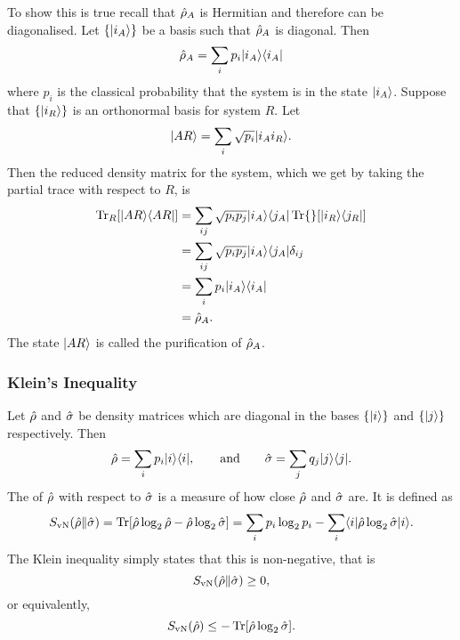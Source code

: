     To show this is true recall that \(\hat{\rho}_A\) is Hermitian and therefore can be diagonalised.
    Let \(\{\vert {i_A} \rangle\}\) be a basis such that \(\hat{\rho}_A\) is diagonal.
    Then
    \[\hat{\rho}_A = \sum_i p_i\vert {i_A}\rangle\langle {i_A} \vert\]
    where \(p_i\) is the classical probability that the system is in the state \(\vert {i_A} \rangle\).
    Suppose that \(\{\vert {i_R} \rangle\}\) is an orthonormal basis for system \(R\).
    Let 
    \[\vert {AR} \rangle = \sum_i \sqrt{p_i}\vert {i_Ai_R} \rangle.\]
    Then the reduced density matrix for the system, which we get by taking the partial trace with respect to \(R\), is
    \begin{align*}
        \Tr_R[\vert {AR}\rangle\langle {AR} \vert] &= \sum_{ij} \sqrt{p_ip_j}\vert {i_A}\rangle\langle {j_A} \vert\Tr{}[\vert {i_R}\rangle\langle {j_R} \vert]\\
        &= \sum_{ij}\sqrt{p_ip_j}\vert {i_A}\rangle\langle {j_A} \vert\delta_{ij}\\
        &= \sum_i p_i\vert {i_A}\rangle\langle {i_A} \vert\\
        &= \hat{\rho}_A.
    \end{align*}
    The state \(\vert {AR} \rangle\) is called the purification of \(\hat{\rho}_A\).
    
    \subsubsection{Klein's Inequality}\label{sec:klein's inequality}
    Let \(\hat{\rho}\) and \(\hat{\sigma}\) be density matrices which are diagonal in the bases \(\{\vert {i} \rangle\}\) and \(\{\vert {j} \rangle\}\) respectively.
    Then
    \[\hat{\rho} = \sum_i p_i\vert {i}\rangle\langle {i} \vert, \qquad\text{and}\qquad \hat{\sigma} = \sum_j q_j\vert {j}\rangle\langle {j} \vert.\]
    The  of \(\hat{\rho}\) with respect to \(\hat{\sigma}\) is a measure of how close \(\hat{\rho}\) and \(\hat{\sigma}\) are.
    It is defined as
    \[S_{\mathrm{vN}}(\hat{\rho}\|\hat{\sigma}) = \Tr[\hat{\rho}\log_2\hat{\rho} - \hat{\rho}\log_2\hat{\sigma}] = \sum_i p_i\log_2p_i - \sum_i \langle {i} \vert\hat{\rho}\log_2\hat{\sigma}\vert {i} \rangle.\]
    The Klein inequality simply states that this is non-negative, that is
    \[S_{\mathrm{vN}}(\hat{\rho}\|\hat{\sigma}) \ge 0,\]
    or equivalently,
    \[S_{\mathrm{vN}}(\hat{\rho}) \le -\Tr[\hat{\rho}\log_2\hat{\sigma}].\]
    

